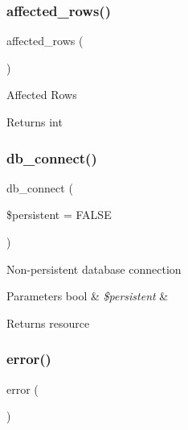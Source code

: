 \subsubsection{\texorpdfstring{affected\+\_\+rows()}{affected\_rows()}}
{\footnotesize\ttfamily affected\+\_\+rows (\begin{DoxyParamCaption}{ }\end{DoxyParamCaption})}

Affected Rows

\begin{DoxyReturn}{Returns}
int 
\end{DoxyReturn}
\mbox{\label{class_c_i___d_b__ibase__driver_a52bf595e79e96cc0a7c907a9b45aeb4d}} 
\subsubsection{\texorpdfstring{db\+\_\+connect()}{db\_connect()}}
{\footnotesize\ttfamily db\+\_\+connect (\begin{DoxyParamCaption}\item[{}]{\$persistent = {\ttfamily FALSE} }\end{DoxyParamCaption})}

Non-\/persistent database connection


\begin{DoxyParams}[1]{Parameters}
bool & {\em \$persistent} & \\
\hline
\end{DoxyParams}
\begin{DoxyReturn}{Returns}
resource 
\end{DoxyReturn}
\mbox{\label{class_c_i___d_b__ibase__driver_a43b8d30b879d4f09ceb059b02af2bc02}} 
\subsubsection{\texorpdfstring{error()}{error()}}
{\footnotesize\ttfamily error (\begin{DoxyParamCaption}{ }\end{DoxyParamCaption})}

